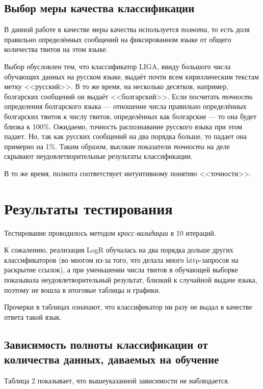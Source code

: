 \documentclass[a4paper, 14pt]{article}
\begin{document}
		\subsection{Выбор меры качества классификации}
		В данной работе в качестве меры качества используется \textit{полнота}, то есть доля правильно определённых сообщений на фиксированном языке
		от общего количества твитов на этом языке.
		
		Выбор обусловлен тем, что классификатор LIGA, ввиду большого числа обучающих данных на русском языке,
		выдаёт почти всем кириллическим текстам метку <<русский>>. В то же время, на несколько десятков, например, болгарских сообщений он выдаёт 
		<<болгарский>>. Если посчитать \textit{точность} определения болгарского языка --- отношение числа правильно определённых болгарских твитов 
		к числу твитов, определённых как болгарские --- то она будет близка к 100\%. Ожидаемо, точность распознавание русского языка при этом падает.
		Но, так как русских сообщений на два порядка больше, то падает она примерно на 1\%. Таким образом, высокие показатели \textit{точности} на деле
		скрывают неудовлетворительные результаты классификации.
		
		В то же время, полнота соответствует интуитивному понятию <<точности>>.
       
\section{Результаты тестирования}
		Тестирование проводилось методом \textit{кросс-валидации} в 10 итераций.
		
		К сожалению, реализация LogR обучалась на два порядка дольше других классификаторов (во многом из-за того, что делала много http-запросов
		на раскрытие ссылок), а при уменьшении числа твитов в обучающей выборке показывала неудовлетворительный результат, близкий к случайной
		выдаче языка, поэтому не вошла в итоговые таблицы и графики.
		
		Прочерки в таблицах означают, что классификатор ни разу не выдал в качестве ответа такой язык.
		
		\subsection{Зависимость полноты классификации от количества данных, даваемых на обучение}
		Таблица 2 показывает, что вышеуказанной зависимости не наблюдается.
		
\end{document}
